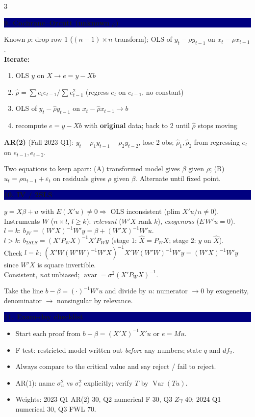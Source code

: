 \documentclass[7.5pt,landscape]{extarticle}
\newcommand{\hd}[1]{\par\vspace{3pt}\noindent\colorbox{navy}{\parbox{\dimexpr\linewidth-2\fboxsep}{\color{white}\bfseries #1}}\par\vspace{1pt}}
\newcommand{\think}[1]{\par\noindent{\color{grn}\textbf{Think:}} {\color{grn}#1}\par}
\newcommand{\Var}{\operatorname{Var}}\newcommand{\Cov}{\operatorname{Cov}}\newcommand{\E}{\mathbb E}
\begin{document}
\begin{multicols}{3}
\hd{9. Cochrane--Orcutt (unknown $\rho$)}
Known $\rho$: drop row 1 ($(n-1)\times n$ transform); OLS of $y_t-\rho y_{t-1}$ on $x_t-\rho x_{t-1}$.\\
\textbf{Iterate:}
\begin{enumerate}[label=\arabic*.]
\item OLS $y$ on $X\to e=y-Xb$
\item $\hat\rho=\sum e_te_{t-1}\big/\sum e_{t-1}^2$ (regress $e_t$ on $e_{t-1}$, no constant)
\item OLS of $y_t-\hat\rho y_{t-1}$ on $x_t-\hat\rho x_{t-1}\to b$
\item recompute $e=y-Xb$ with \textbf{original} data; back to 2 until $\hat\rho$ stops moving
\end{enumerate}
\textbf{AR(2)} (Fall 2023 Q1): $y_t-\rho_1y_{t-1}-\rho_2y_{t-2}$, lose 2 obs; $\hat\rho_1,\hat\rho_2$ from regressing $e_t$ on $e_{t-1},e_{t-2}$.
\think{Two equations to keep apart: (A) transformed model gives $\beta$ given $\rho$; (B) $u_t=\rho u_{t-1}+\varepsilon_t$ on residuals gives $\rho$ given $\beta$. Alternate until fixed point.}

\hd{10. IV / 2SLS}
$y=X\beta+u$ with $E(X'u)\ne0\Rightarrow$ OLS inconsistent (plim $X'u/n\ne0$).\\
Instruments $W$ ($n\times l$, $l\ge k$): \emph{relevant} ($W'X$ rank $k$), \emph{exogenous} ($E\,W'u=0$).\\
$l=k$: $b_{IV}=(W'X)^{-1}W'y=\beta+(W'X)^{-1}W'u$.\\
$l>k$: $b_{2SLS}=(X'P_WX)^{-1}X'P_Wy$ (stage 1: $\hat X=P_WX$; stage 2: $y$ on $\hat X$).\\
Check $l=k$: $(X'W(W'W)^{-1}W'X)^{-1}X'W(W'W)^{-1}W'y=(W'X)^{-1}W'y$ since $W'X$ is square invertible.\\
Consistent, \emph{not} unbiased; $\operatorname{avar}=\sigma^2(X'P_WX)^{-1}$.
\think{Take the line $b-\beta=(\cdot)^{-1}W'u$ and divide by $n$: numerator $\to0$ by exogeneity, denominator $\to$ nonsingular by relevance.}

\hd{11. Exam-day checklist}
\begin{itemize}
\item Start each proof from $b-\beta=(X'X)^{-1}X'u$ or $e=Mu$.
\item F test: restricted model written out \emph{before} any numbers; state $q$ and $df_2$.
\item Always compare to the critical value and say reject / fail to reject.
\item AR(1): name $\sigma_u^2$ vs $\sigma_\varepsilon^2$ explicitly; verify $T$ by $\Var(Tu)$.
\item Weights: 2023 Q1 AR(2) 30, Q2 numerical F 30, Q3 $Z\gamma$ 40; 2024 Q1 numerical 30, Q3 FWL 70.
\end{itemize}
\end{multicols}
\end{document}
